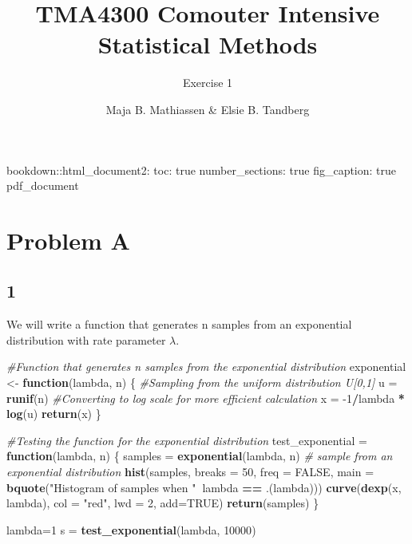 \documentclass[
]{article}
\title{TMA4300 Comouter Intensive Statistical Methods}
\subtitle{Exercise 1}
\author{Maja B. Mathiassen \& Elsie B. Tandberg}
\date{}
\newenvironment{Shaded}{\begin{snugshade}}{\end{snugshade}}
\newcommand{\CommentTok}[1]{\textcolor[rgb]{0.56,0.35,0.01}{\textit{#1}}}
\newcommand{\ControlFlowTok}[1]{\textcolor[rgb]{0.13,0.29,0.53}{\textbf{#1}}}
\newcommand{\DataTypeTok}[1]{\textcolor[rgb]{0.13,0.29,0.53}{#1}}
\newcommand{\DecValTok}[1]{\textcolor[rgb]{0.00,0.00,0.81}{#1}}
\newcommand{\KeywordTok}[1]{\textcolor[rgb]{0.13,0.29,0.53}{\textbf{#1}}}
\newcommand{\NormalTok}[1]{#1}
\newcommand{\OperatorTok}[1]{\textcolor[rgb]{0.81,0.36,0.00}{\textbf{#1}}}
\newcommand{\OtherTok}[1]{\textcolor[rgb]{0.56,0.35,0.01}{#1}}
\newcommand{\StringTok}[1]{\textcolor[rgb]{0.31,0.60,0.02}{#1}}
\begin{document}
\maketitle

bookdown::html\_document2: toc: true number\_sections: true
fig\_caption: true pdf\_document

\hypertarget{problem-a}{%
\section{Problem A}\label{problem-a}}

\hypertarget{section}{%
\subsection{1}\label{section}}

We will write a function that generates n samples from an exponential
distribution with rate parameter \(\lambda\).

\begin{Shaded}
\begin{Highlighting}[]
\CommentTok{#Function that generates n samples from the exponential distribution}
\NormalTok{exponential <-}\StringTok{ }\ControlFlowTok{function}\NormalTok{(lambda, n) \{}
  \CommentTok{#Sampling from the uniform distribution U[0,1]}
\NormalTok{  u =}\StringTok{ }\KeywordTok{runif}\NormalTok{(n)}
  \CommentTok{#Converting to log scale for more efficient calculation}
\NormalTok{  x =}\StringTok{ }\DecValTok{-1}\OperatorTok{/}\NormalTok{lambda }\OperatorTok{*}\StringTok{ }\KeywordTok{log}\NormalTok{(u)}
  \KeywordTok{return}\NormalTok{(x)}
\NormalTok{\}}

\CommentTok{#Testing the function for the exponential distribution}
\NormalTok{test_exponential =}\StringTok{ }\ControlFlowTok{function}\NormalTok{(lambda, n) \{}
\NormalTok{  samples =}\StringTok{ }\KeywordTok{exponential}\NormalTok{(lambda, n) }\CommentTok{# sample from an exponential distribution}
  \KeywordTok{hist}\NormalTok{(samples, }\DataTypeTok{breaks =} \DecValTok{50}\NormalTok{, }\DataTypeTok{freq =} \OtherTok{FALSE}\NormalTok{, }\DataTypeTok{main =} \KeywordTok{bquote}\NormalTok{(}\StringTok{"Histogram of samples when "}\OperatorTok{~}\NormalTok{lambda }\OperatorTok{==}\StringTok{ }\NormalTok{.(lambda)))}
  \KeywordTok{curve}\NormalTok{(}\KeywordTok{dexp}\NormalTok{(x, lambda), }\DataTypeTok{col =} \StringTok{"red"}\NormalTok{, }\DataTypeTok{lwd =} \DecValTok{2}\NormalTok{, }\DataTypeTok{add=}\OtherTok{TRUE}\NormalTok{)}
  \KeywordTok{return}\NormalTok{(samples)}
\NormalTok{\}}

\NormalTok{lambda=}\DecValTok{1}
\NormalTok{s =}\StringTok{ }\KeywordTok{test_exponential}\NormalTok{(lambda, }\DecValTok{10000}\NormalTok{)}
\end{Highlighting}
\end{Shaded}
\end{document}
